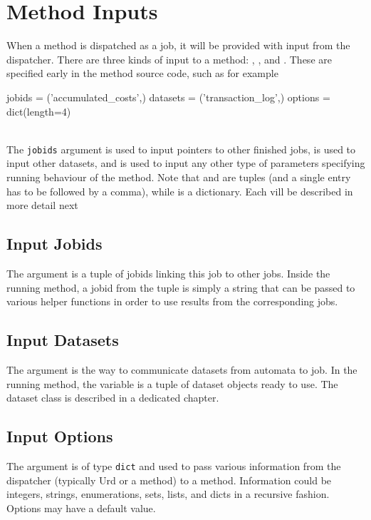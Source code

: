 \section{Method Inputs}

When a method is dispatched as a job, it will be provided with input
from the dispatcher.  There are three kinds of input to a method:
\jobids, \datasets, and \options.  These are specified early in the
method source code, such as for example
\\
\begin{python}
jobids = ('accumulated_costs',)
datasets = ('transaction_log',)
options = dict(length=4)
\end{python}
\\
The \texttt{jobids} argument is used to input pointers to other
finished jobs, \datasets is used to input other datasets, and \options
is used to input any other type of parameters specifying running
behaviour of the method.  Note that \jobids and \datasets are tuples
(and a single entry has to be followed by a comma), while \options is
a dictionary.  Each vill be described in more detail next



\subsection{Input Jobids}
The \jobids argument is a tuple of jobids linking this job to other
jobs.  Inside the running method, a jobid from the \jobids tuple is
simply a string that can be passed to various helper functions in
order to use results from the corresponding jobs.



\subsection{Input Datasets}
The \datasets argument is the way to communicate datasets from
automata to job.  In the running method, the \datasets variable is a
tuple of dataset objects ready to use.  The dataset class is described
in a dedicated chapter.




\subsection{Input Options}

The \options argument is of type \texttt{dict} and used to pass
various information from the dispatcher (typically Urd or a method) to
a method.  Information could be integers, strings, enumerations, sets,
lists, and dicts in a recursive fashion.  Options may have a default
value.

